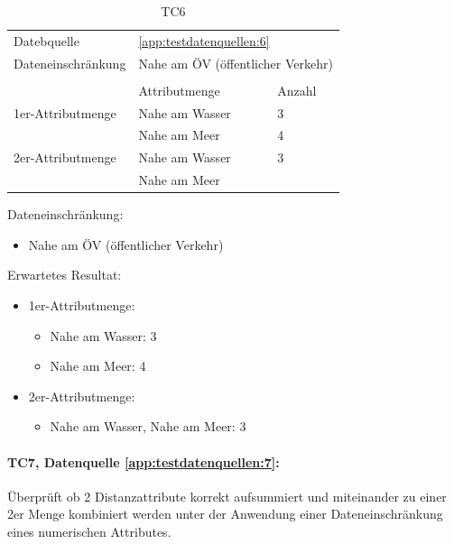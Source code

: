 \begin{table}[H] 
	\caption{TC6}
	\centering
	\label{fig:recherche:testcases:6}
	\begin{tabular}{ | l | l | l | } 
		\hline 
		\rowcolor{tableheadcolor}
		\multicolumn{3}{|l|}{\bfseries ID: TC6} \\ \hline 
		Datebquelle & \multicolumn{2}{|l|}{\cref{app:testdatenquellen:6}} \\ \hline 
		Dateneinschränkung & \multicolumn{2}{|l|}{Nahe am ÖV (öffentlicher Verkehr)} \\ \hline 
		
		\rowcolor{tableheadcolor}
		\multicolumn{3}{|l|}{\bfseries Erwartetes Resultat} \\ \hline 
		& Attributmenge & Anzahl \\ \hline 
		
		1er-Attributmenge & \tabitem Nahe am Wasser & 3 \\ \cline{2-3} 
		& \tabitem Nahe am Meer & 4 \\ \hline 
		
		2er-Attributmenge & \tabitem Nahe am Wasser & 3 \\
		& \tabitem Nahe am Meer & \\ \hline
	\end{tabular}
\end{table}

Dateneinschränkung:
\begin{itemize}
	\item Nahe am ÖV (öffentlicher Verkehr)
\end{itemize}

Erwartetes Resultat:
\begin{itemize}
	\item 1er-Attributmenge:
	\begin{itemize}
		\item Nahe am Wasser: 3
		\item Nahe am Meer: 4
	\end{itemize}
	\item 2er-Attributmenge:
	\begin{itemize}
		\item Nahe am Wasser, Nahe am Meer: 3
	\end{itemize}
\end{itemize}

\paragraph{TC7, Datenquelle \cref{app:testdatenquellen:7}:} Überprüft ob 2 Distanzattribute korrekt aufsummiert und miteinander zu einer 2er Menge kombiniert werden unter der Anwendung einer Dateneinschränkung eines numerischen Attributes. 

